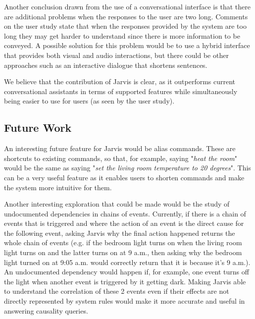 \documentclass[runningheads]{llncs}
\begin{document}
Another conclusion drawn from the use of a conversational interface is that there are additional problems when the responses to the user are two long. Comments on the user study state that when the responses provided by the system are too long they may get harder to understand since there is more information to be conveyed. A possible solution for this problem would be to use a hybrid interface that provides both visual and audio interactions, but there could be other approaches such as an interactive dialogue that shortens sentences.

We believe that the contribution of Jarvis is clear, as it outperforms current conversational assistants in terms of supported features while simultaneously being easier to use for users (as seen by the user study).

\subsection{Future Work}\label{sec:futurework}

An interesting future feature for Jarvis would be alias commands. These are shortcuts to existing commands, so that, for example, saying "\textit{heat the room}" would be the same as saying "\textit{set the living room temperature to 20 degrees}". This can be a very useful feature as it enables users to shorten commands and make the system more intuitive for them.

Another interesting exploration that could be made would be the study of undocumented dependencies in chains of events. Currently, if there is a chain of events that is triggered and where the action of an event is the direct cause for the following event, asking Jarvis why the final action happened returns the whole chain of events (e.g. if the bedroom light turns on when the living room light turns on and the latter turns on at 9 a.m., then asking why the bedroom light turned on at 9:05 a.m. would correctly return that it is because it's 9 a.m.). An undocumented dependency would happen if, for example, one event turns off the light when another event is triggered by it getting dark. Making Jarvis able to understand the correlation of these 2 events even if their effects are not directly represented by system rules would make it more accurate and useful in answering causality queries.

\end{document}

